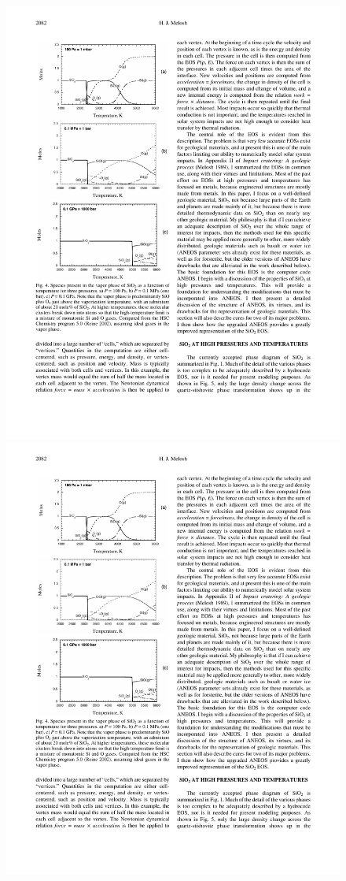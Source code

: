 \begin{figure}
\includegraphics[scale=1.0]{05aneos_phases01}
\includegraphics[scale=1.0]{05aneos_phases02}

\end{figure}

